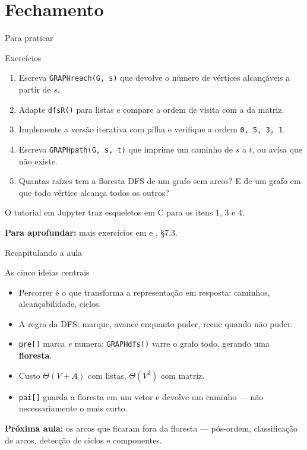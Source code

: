 \documentclass[aspectratio=169]{beamer}
\newcommand{\fonte}[1]{%
  \vfill
  {\tiny\color{gray!55!black}\textbf{Para aprofundar:} #1\par}%
}
\begin{document}
\section{Fechamento}

\begin{frame}{Para praticar}
  \begin{block}{Exercícios}
    {\small
    \begin{enumerate}\small
      \item Escreva \texttt{GRAPHreach(G, s)} que devolve o número de vértices
            alcançáveis a partir de $s$.
      \item Adapte \texttt{dfsR()} para listas e compare a ordem de visita com a
            da matriz.
      \item Implemente a versão iterativa com pilha e verifique a ordem
            \texttt{0, 5, 3, 1}.
      \item Escreva \texttt{GRAPHpath(G, s, t)} que imprime um caminho de $s$ a
            $t$, ou avisa que não existe.
      \item Quantas raízes tem a floresta DFS de um grafo sem arcos? E de um
            grafo em que todo vértice alcança todos os outros?
    \end{enumerate}}
  \end{block}
  {\scriptsize O tutorial em Jupyter traz esqueletos em C para os itens 1, 3 e 4.}
  \fonte{mais exercícios em \cite{feofiloff2020algoritmos} e \cite{ziviani2011projeto}, §7.3.}
\end{frame}

\begin{frame}{Recapitulando a aula}
  \begin{block}{As cinco ideias centrais}
    \begin{itemize}\small
      \item Percorrer é o que transforma a representação em resposta: caminhos,
            alcançabilidade, ciclos.
      \item A regra da DFS: marque, avance enquanto puder, recue quando não puder.
      \item \texttt{pre[]} marca \emph{e} numera; \texttt{GRAPHdfs()} varre o
            grafo todo, gerando uma \textbf{floresta}.
      \item Custo $\Theta(V+A)$ com listas, $\Theta(V^2)$ com matriz.
      \item \texttt{pai[]} guarda a floresta em um vetor e devolve um caminho ---
            não necessariamente o mais curto.
    \end{itemize}
  \end{block}
  {\small \textbf{Próxima aula:} os arcos que ficaram fora da floresta ---
  pós-ordem, classificação de arcos, detecção de ciclos e componentes.}
\end{frame}
\end{document}
